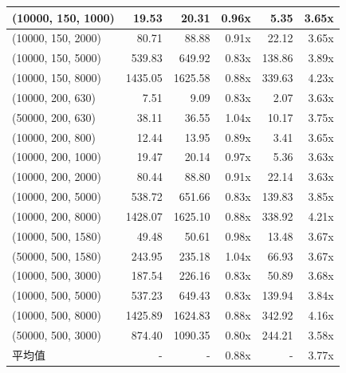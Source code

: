 \documentclass[a4paper]{article}
\begin{document}
\begin{table}[tbp]
\begin{tabular}{l|r|rr|rr}
    \midrule
    (10000, 150, 1000) & 19.53 & 20.31 & 0.96x & 5.35 & 3.65x \\
    \midrule
    (10000, 150, 2000) & 80.71 & 88.88 & 0.91x &22.12 & 3.65x \\
    \midrule
    (10000, 150, 5000) & 539.83 & 649.92 & 0.83x &138.86 & 3.89x \\
    \midrule
    (10000, 150, 8000) & 1435.05 & 1625.58 & 0.88x &339.63 & 4.23x \\
    \midrule
    (10000, 200, 630) & 7.51 & 9.09 & 0.83x & 2.07 & 3.63x \\
    \midrule
    (50000, 200, 630) & 38.11 & 36.55 & 1.04x & 10.17 & 3.75x \\
    \midrule
    (10000, 200, 800) & 12.44 & 13.95 & 0.89x & 3.41 & 3.65x \\
    \midrule
    (10000, 200, 1000) & 19.47 & 20.14 & 0.97x & 5.36 & 3.63x \\
    \midrule
    (10000, 200, 2000) & 80.44 & 88.80 & 0.91x &  22.14 & 3.63x \\
    \midrule
    (10000, 200, 5000) & 538.72 & 651.66 & 0.83x & 139.83 & 3.85x \\
    \midrule
    (10000, 200, 8000) & 1428.07 & 1625.10 & 0.88x & 338.92 & 4.21x \\
    \midrule
    (10000, 500, 1580) & 49.48 & 50.61 & 0.98x & 13.48 & 3.67x \\
    \midrule
    (50000, 500, 1580) & 243.95 & 235.18 & 1.04x & 66.93 & 3.67x \\
    \midrule
    (10000, 500, 3000) & 187.54 & 226.16 & 0.83x & 50.89 & 3.68x  \\
    \midrule
    (10000, 500, 5000) & 537.23 & 649.43 & 0.83x & 139.94 & 3.84x \\
    \midrule
    (10000, 500, 8000) & 1425.89 & 1624.83 & 0.88x & 342.92 & 4.16x \\
    \midrule
    (50000, 500, 3000) & 874.40 & 1090.35 & 0.80x & 244.21 & 3.58x\\
    \midrule
    平均值 & - & - & 0.88x & -  & 3.77x \\
    \bottomrule    
  \end{tabular}
  \label{tlb:perf}
\end{table}
\end{document}
